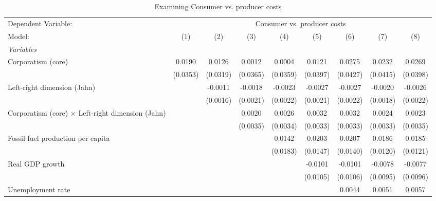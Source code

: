 
\begin{table}[htbp]
   \caption{Examining Consumer vs. producer costs}
   \centering
   \begin{tabular}{lcccccccc}
      \tabularnewline \midrule \midrule
      Dependent Variable: & \multicolumn{8}{c}{Consumer vs. producer costs}\\
      Model:                                                   & (1)      & (2)      & (3)      & (4)      & (5)      & (6)      & (7)      & (8)\\  
      \midrule
      \emph{Variables}\\
      Corporatism (core)                                       & 0.0190   & 0.0126   & 0.0012   & 0.0004   & 0.0121   & 0.0275   & 0.0232   & 0.0269\\   
                                                               & (0.0353) & (0.0319) & (0.0365) & (0.0359) & (0.0397) & (0.0427) & (0.0415) & (0.0398)\\   
      Left-right dimension (Jahn)                              &          & -0.0011  & -0.0018  & -0.0023  & -0.0027  & -0.0027  & -0.0020  & -0.0026\\   
                                                               &          & (0.0016) & (0.0021) & (0.0022) & (0.0021) & (0.0022) & (0.0018) & (0.0022)\\   
      Corporatism (core) $\times$ Left-right dimension (Jahn)  &          &          & 0.0020   & 0.0026   & 0.0032   & 0.0032   & 0.0024   & 0.0023\\   
                                                               &          &          & (0.0035) & (0.0034) & (0.0033) & (0.0033) & (0.0033) & (0.0035)\\   
      Fossil fuel production per capita                        &          &          &          & 0.0142   & 0.0203   & 0.0207   & 0.0186   & 0.0185\\   
                                                               &          &          &          & (0.0183) & (0.0147) & (0.0140) & (0.0120) & (0.0121)\\   
      Real GDP growth                                          &          &          &          &          & -0.0101  & -0.0101  & -0.0078  & -0.0077\\   
                                                               &          &          &          &          & (0.0105) & (0.0106) & (0.0095) & (0.0096)\\   
      Unemployment rate                                        &          &          &          &          &          & 0.0044   & 0.0051   & 0.0057\\   

\end{tabular}
\end{table}
